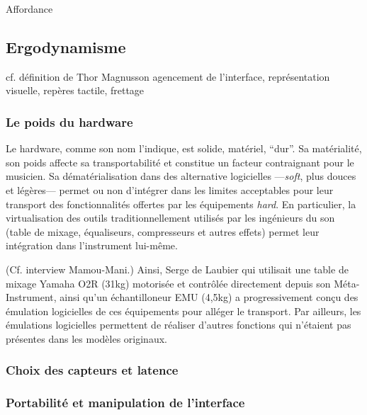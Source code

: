  \cite{bin_hands_2017}

Affordance

\subsection{Ergodynamisme}
cf. définition de Thor Magnusson
agencement de l’interface, représentation visuelle, repères tactile, frettage

\subsubsection{Le poids du hardware}

\noindent Le hardware, comme son nom l'indique, est solide, matériel, ``dur''. Sa matérialité, son poids affecte sa transportabilité et constitue un facteur contraignant pour le musicien. Sa dématérialisation dans des alternative logicielles —\textit{soft}, plus douces et légères— permet ou non d'intégrer dans les limites acceptables pour leur transport des fonctionnalités offertes par les équipements \textit{hard}.
En particulier, la virtualisation des outils traditionnellement utilisés par les ingénieurs du son (table de mixage, équaliseurs, compresseurs et autres effets) permet leur intégration dans l'instrument lui-même.

(Cf. interview Mamou-Mani.)
Ainsi, Serge de Laubier qui utilisait une table de mixage Yamaha O2R (31kg) motorisée et contrôlée directement depuis son Méta-Instrument, ainsi qu'un échantilloneur EMU (4,5kg) a progressivement conçu des émulation logicielles de ces équipements pour alléger le transport. Par ailleurs, les émulations logicielles permettent de réaliser d'autres fonctions qui n'étaient pas présentes dans les modèles originaux.


\subsubsection{Choix des capteurs et latence}




\subsubsection{Portabilité et manipulation de l'interface}

